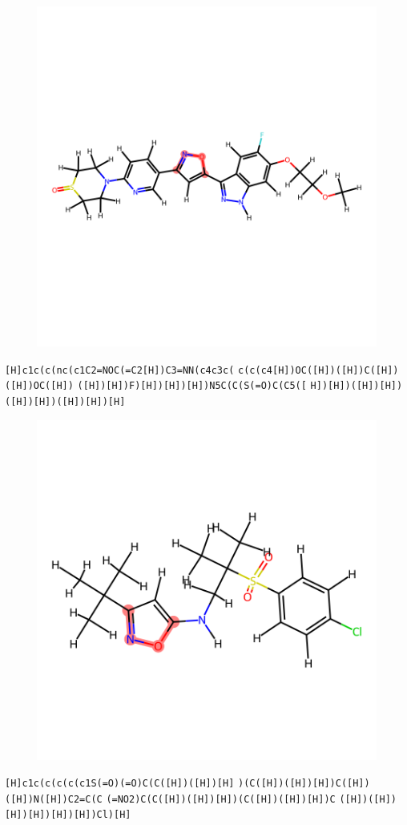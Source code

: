 \documentclass{article}
\begin{document}
\begin{figure}[ht]
\centering
    \includegraphics{mol146.png}
\end{figure}
\verb|[H]c1c(c(nc(c1C2=NOC(=C2[H])C3=NN(c4c3c(| \verb|c(c(c4[H])OC([H])([H])C([H])([H])OC([H])| \verb|([H])[H])F)[H])[H])[H])N5C(C(S(=O)C(C5([| \verb|H])[H])([H])[H])([H])[H])([H])[H])[H]|

\clearpage

\begin{figure}[ht]
\centering
    \includegraphics{mol147.png}
\end{figure}
\verb|[H]c1c(c(c(c(c1S(=O)(=O)C(C([H])([H])[H]| \verb|)(C([H])([H])[H])C([H])([H])N([H])C2=C(C| \verb|(=NO2)C(C([H])([H])[H])(C([H])([H])[H])C| \verb|([H])([H])[H])[H])[H])[H])Cl)[H]|
\end{document}
